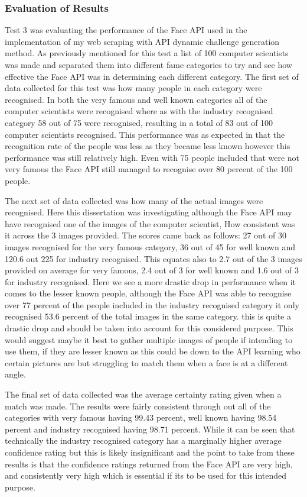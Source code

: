 \documentclass[12pt,a4paper]{article}
\begin{document}
\subsubsection{Evaluation of Results} 
Test 3 was evaluating the performance of the Face API used in the implementation of my web scraping with API dynamic challenge generation method. 
As previously mentioned for this test a list of 100 computer scientists was made and separated them into different fame categories to try and see how effective the Face API was in determining each different category. The first set of data collected for this test was how many people in each category were recognised. In both the very famous and well known categories all of the computer scientists were recognised where as with the industry recognised category 58 out of 75 were recognised, resulting in a total of 83 out of 100 computer scientists recognised. This performance was as expected in that the recognition rate of the people was less as they became less known however this performance was still relatively high. Even with 75 people included that were not very famous the Face API still managed to recognise over 80 percent of the 100 people.  

The next set of data collected was how many of the actual images were recognised. Here this dissertation was investigating although the Face API may have recognised one of the images of the computer scientist, How consistent was it across the 3 images provided. The scores came back as follows: 27 out of 30 images recognised for the very famous category, 36 out of 45 for well known and 120.6 out 225 for industry recognised. This equates also to 2.7 out of the 3 images provided on average for very famous, 2.4 out of 3 for well known and 1.6 out of 3 for industry recognised. Here we see a more drastic drop in performance when it comes to the lesser known people, although the Face API was able to recognise over 77 percent of the people included in the industry recognised category it only recognised 53.6 percent of the total images in the same category. this is quite a drastic drop and should be taken into account for this considered purpose. This would suggest maybe it best to gather multiple images of people if intending to use them, if they are lesser known as this could be down to the API learning who certain pictures are but struggling to match them when a face is at a different angle.  

The final set of data collected was the average certainty rating given when a match was made. The results were fairly consistent through out all of the categories with very famous having 99.43 percent, well known having 98.54 percent and industry recognised having 98.71 percent. While it can be seen that technically the industry recognised category has a marginally higher average confidence rating but this is likely insignificant and the point to take from these results is that the confidence ratings returned from the Face API are very high, and consistently very high which is essential if its to be used for this intended purpose. 
\end{document}
